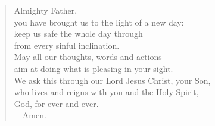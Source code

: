 \prayer

\setlength{\leftmargini}{\prayerleftmargini}

\begin{verse}
Almighty Father,\\
you have brought us to the light of a new day:\\
keep us safe the whole day through\\
from every sinful inclination.\\
May all our thoughts, words and actions\\
aim at doing what is pleasing in your sight.\\
We ask this through our Lord Jesus Christ, your Son,\\
who lives and reigns with you and the Holy Spirit,\\
God, for ever and ever.\\
{\color{red}---\thinspace}Amen.
\end{verse}

\setlength{\leftmargini}{\defleftmargini}